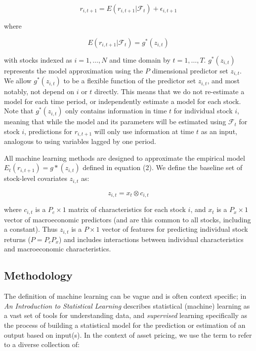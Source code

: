 \documentclass[11pt, a4paper, table]{article}
\begin{document}
\begin{equation}
	r_{i, t+1} = E(r_{i, t+1} | \mathcal{F}_t) + \epsilon_{i, t+1}
\end{equation}

where 

\begin{equation}
	E(r_{i, t+1} | \mathcal{F}_t) = g^*(z_{i,t})
\end{equation}

with stocks indexed as $i = 1, \dots, N$ and time domain by $t = 1, \dots, T$. $g^*(z_{i,t})$ represents the model approximation using the $P$ dimensional predictor set $z_{i,t}$. We allow $g^*(z_{i,t})$ to be a flexible function of the predictor set $z_{i,t}$, and most notably, not depend on $i$ or $t$ directly. This means that we do not re-estimate a model for each time period, or independently estimate a model for each stock. Note that $g^*(z_{i,t})$ only contains information in time $t$ for individual stock $i$, meaning that while the model and its parameters will be estimated using $\mathcal{F}_t$ for stock $i$, predictions for $r_{i, t+1}$ will only use information at time $t$ as an input, analogous to using variables lagged by one period. 

All machine learning methods are designed to approximate the empirical model \( E_t(r_{i, t+1}) = g*(z_{i,t}) \) defined in equation (2). We define the baseline set of stock-level covariates \( z_{i,t} \) as:

\begin{equation}
\label{kronecker_equation}
z_{i,t} = x_t \otimes c_{i,t}
\end{equation}

where \( c_{i,t} \) is a \( P_c \times 1 \) matrix of characteristics for each stock \(i\), and \(x_t\) is a $P_x \times 1$ vector of macroeconomic predictors (and are this common to all stocks, including a constant). Thus $z_{i,t}$ is a $P \times 1$ vector of features for predicting individual stock returns ($P = P_cP_x$) and includes interactions between individual characteristics and macroeconomic characteristics. 

\subsection{Methodology}

The definition of machine learning can be vague and is often context specific; \cite{hastie_elements_2009} in \textit{An Introduction to Statistical Learning} describes statistical (machine) learning as a vast set of tools for understanding data, and \textit{supervised} learning specifically as the process of building a statistical model for the prediction or estimation of an output based on input(s). In the context of asset pricing, we use the term to refer to a diverse collection of:
\end{document}
